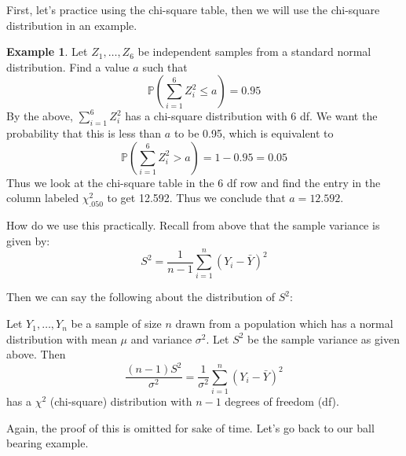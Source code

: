 \documentclass[12pt]{article}
\theoremstyle{definition}
\newtheorem*{example}{Example}
\theoremstyle{remark}
\def\P{{\mathbb P}}
\begin{document}
First, let's practice using the chi-square table, then we will use the chi-square distribution in an example.

\begin{example}Let $Z_1, \dots, Z_6$ be independent samples from a standard normal distribution. Find a value $a$ such that
\[
\P\left( \sum_{i=1}^6 Z_i^2 \leq a \right) = 0.95
\]
By the above, $\sum_{i=1}^6 Z_i^2$ has a chi-square distribution with 6 df. We want the probability that this is less than $a$ to be 0.95, which is equivalent to 
\[
\P\left( \sum_{i=1}^6 Z_i^2 > a \right) = 1 - 0.95 = 0.05
\]
Thus we look at the chi-square table in the 6 df row and find the entry in the column labeled $\chi^2_{.050}$ to get 12.592. Thus we conclude that $a = 12.592$.
\end{example}

How do we use this practically. Recall from above that the sample variance is given by:
\[
S^2 = \frac{1}{n-1} \sum_{i=1}^n (Y_i - \bar{Y})^2
\]

Then we can say the following about the distribution of $S^2$:
\begin{framed}
Let $Y_1, \dots, Y_n$ be a sample of size $n$ drawn from a population which has a normal distribution with mean $\mu$ and variance $\sigma^2$. Let $S^2$ be the sample variance as given above. Then
\[
\frac{(n-1)S^2}{\sigma^2} = \frac{1}{\sigma^2}\sum_{i=1}^n (Y_i - \bar{Y})^2
\]
has a $\chi^2$ (chi-square) distribution with $n-1$ degrees of freedom (df).
\end{framed}
Again, the proof of this is omitted for sake of time. Let's go back to our ball bearing example.
\end{document}
